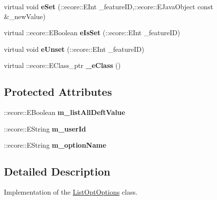 \begin{DoxyCompactItemize}
\item 
\hypertarget{classUMS__Data_1_1ListOptOptions_af40c87b919bc79484924ed92bc09267d}{
virtual void {\bfseries eSet} (::ecore::EInt \_\-featureID,::ecore::EJavaObject const \&\_\-newValue)}
\label{classUMS__Data_1_1ListOptOptions_af40c87b919bc79484924ed92bc09267d}

\item 
\hypertarget{classUMS__Data_1_1ListOptOptions_a95bc1452daad01f984816d2cd3efdc55}{
virtual ::ecore::EBoolean {\bfseries eIsSet} (::ecore::EInt \_\-featureID)}
\label{classUMS__Data_1_1ListOptOptions_a95bc1452daad01f984816d2cd3efdc55}

\item 
\hypertarget{classUMS__Data_1_1ListOptOptions_a233978b3618d9eef40de9993e6587096}{
virtual void {\bfseries eUnset} (::ecore::EInt \_\-featureID)}
\label{classUMS__Data_1_1ListOptOptions_a233978b3618d9eef40de9993e6587096}

\item 
\hypertarget{classUMS__Data_1_1ListOptOptions_a70cca75306f8b0f9682b0932ed00a287}{
virtual ::ecore::EClass\_\-ptr {\bfseries \_\-eClass} ()}
\label{classUMS__Data_1_1ListOptOptions_a70cca75306f8b0f9682b0932ed00a287}

\end{DoxyCompactItemize}
\subsection*{Protected Attributes}
\begin{DoxyCompactItemize}
\item 
\hypertarget{classUMS__Data_1_1ListOptOptions_ade205d44ec6baf809835b00b87f5c0c1}{
::ecore::EBoolean {\bfseries m\_\-listAllDeftValue}}
\label{classUMS__Data_1_1ListOptOptions_ade205d44ec6baf809835b00b87f5c0c1}

\item 
\hypertarget{classUMS__Data_1_1ListOptOptions_a8c40daff10858bec496db3caa2448451}{
::ecore::EString {\bfseries m\_\-userId}}
\label{classUMS__Data_1_1ListOptOptions_a8c40daff10858bec496db3caa2448451}

\item 
\hypertarget{classUMS__Data_1_1ListOptOptions_a5256cdfa06103610be2b3900adddff20}{
::ecore::EString {\bfseries m\_\-optionName}}
\label{classUMS__Data_1_1ListOptOptions_a5256cdfa06103610be2b3900adddff20}

\end{DoxyCompactItemize}


\subsection{Detailed Description}
Implementation of the \hyperlink{classUMS__Data_1_1ListOptOptions}{ListOptOptions} class. 

